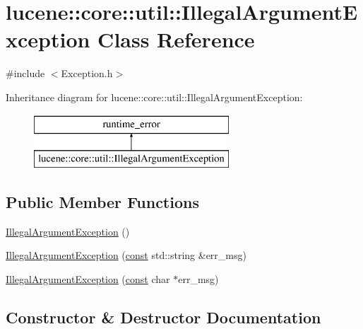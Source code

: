 \hypertarget{classlucene_1_1core_1_1util_1_1IllegalArgumentException}{}\section{lucene\+:\+:core\+:\+:util\+:\+:Illegal\+Argument\+Exception Class Reference}
\label{classlucene_1_1core_1_1util_1_1IllegalArgumentException}


{\ttfamily \#include $<$Exception.\+h$>$}

Inheritance diagram for lucene\+:\+:core\+:\+:util\+:\+:Illegal\+Argument\+Exception\+:\begin{figure}[H]
\begin{center}
\leavevmode
\includegraphics[height=2.000000cm]{classlucene_1_1core_1_1util_1_1IllegalArgumentException}
\end{center}
\end{figure}
\subsection*{Public Member Functions}
\begin{DoxyCompactItemize}
\item 
\mbox{\hyperlink{classlucene_1_1core_1_1util_1_1IllegalArgumentException_a586bc324b09a05ad188f2b118cdab293}{Illegal\+Argument\+Exception}} ()
\item 
\mbox{\hyperlink{classlucene_1_1core_1_1util_1_1IllegalArgumentException_a433246f59b3e9d8eed6aa5584d9b69d4}{Illegal\+Argument\+Exception}} (\mbox{\hyperlink{ZlibCrc32_8h_a2c212835823e3c54a8ab6d95c652660e}{const}} std\+::string \&err\+\_\+msg)
\item 
\mbox{\hyperlink{classlucene_1_1core_1_1util_1_1IllegalArgumentException_acecaae698090764b494ec63b21aa0241}{Illegal\+Argument\+Exception}} (\mbox{\hyperlink{ZlibCrc32_8h_a2c212835823e3c54a8ab6d95c652660e}{const}} char $\ast$err\+\_\+msg)
\end{DoxyCompactItemize}


\subsection{Constructor \& Destructor Documentation}
\mbox{\label{classlucene_1_1core_1_1util_1_1IllegalArgumentException_a586bc324b09a05ad188f2b118cdab293}} 
